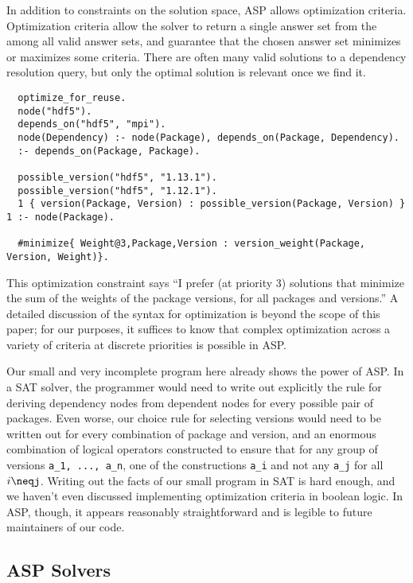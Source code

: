 In addition to constraints on the solution space, ASP allows optimization criteria.
Optimization criteria allow the solver to return a single answer set from the among all valid answer sets, and guarantee that the chosen answer set minimizes or maximizes some criteria.
There are often many valid solutions to a dependency resolution query, but only the optimal solution is relevant once we find it.

\begin{verbatim}
  optimize_for_reuse.
  node("hdf5").
  depends_on("hdf5", "mpi").
  node(Dependency) :- node(Package), depends_on(Package, Dependency).
  :- depends_on(Package, Package).

  possible_version("hdf5", "1.13.1").
  possible_version("hdf5", "1.12.1").
  1 { version(Package, Version) : possible_version(Package, Version) } 1 :- node(Package).

  #minimize{ Weight@3,Package,Version : version_weight(Package, Version, Weight)}.
\end{verbatim}

This optimization constraint says ``I prefer (at priority 3) solutions that minimize the sum of the weights of the package versions, for all packages and versions.''
A detailed discussion of the syntax for optimization is beyond the scope of this paper; for our purposes, it suffices to know that complex optimization across a variety of criteria at discrete priorities is possible in ASP.

Our small and very incomplete program here already shows the power of ASP.
In a SAT solver, the programmer would need to write out explicitly the rule for deriving dependency nodes from dependent nodes for every possible pair of packages.
Even worse, our choice rule for selecting versions would need to be written out for every combination of package and version, and an enormous combination of logical operators constructed to ensure that for any group of versions \texttt{a_1, ..., a_n}, one of the constructions \texttt{a_i} and not any \texttt{a_j} for all $i\neqj$.
Writing out the facts of our small program in SAT is hard enough, and we haven't even discussed implementing optimization criteria in boolean logic.
In ASP, though, it appears reasonably straightforward and is legible to future maintainers of our code.

\subsection{ASP Solvers}

